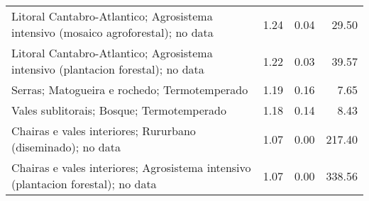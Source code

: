 \begin{table}[p]
\begin{tabular}{lrrr}
  Litoral Cantabro-Atlantico; Agrosistema intensivo (mosaico agroforestal); no data & 1.24 & 0.04 & 29.50 \\ 
  Litoral Cantabro-Atlantico; Agrosistema intensivo (plantacion forestal); no data & 1.22 & 0.03 & 39.57 \\ 
  Serras; Matogueira e rochedo; Termotemperado & 1.19 & 0.16 & 7.65 \\ 
  Vales sublitorais; Bosque; Termotemperado & 1.18 & 0.14 & 8.43 \\ 
  Chairas e vales interiores; Rururbano (diseminado); no data & 1.07 & 0.00 & 217.40 \\ 
  Chairas e vales interiores; Agrosistema intensivo (plantacion forestal); no data & 1.07 & 0.00 & 338.56 \\ 
   \hline
\end{tabular}
\end{table}
